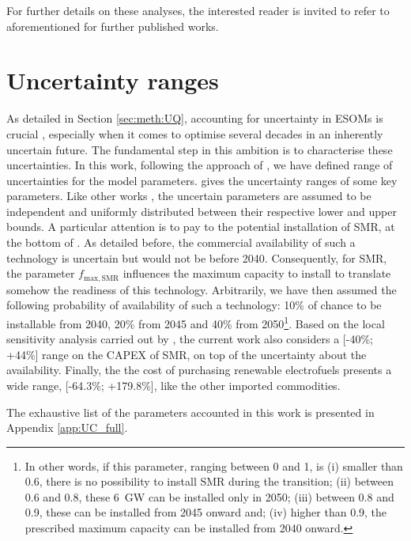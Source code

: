 For further details on these analyses, the interested reader is invited to refer to aforementioned for further published works.

\section{Uncertainty ranges}
\label{sec:cs:uncertainty}
As detailed in Section \ref{sec:meth:UQ}, accounting for uncertainty in \gls{ESOMs} is crucial \cite{mavromatidis2018uncertainty}, especially when it comes to optimise several decades in an inherently uncertain future. The fundamental step in this ambition is to characterise these uncertainties. In this work, following the approach of \citet{Moret2017PhDThesis}, we have defined range of uncertainties for the model parameters.  gives the uncertainty ranges of some key parameters. Like other works \cite{li2019renewables,coppitters2021robust}, the uncertain parameters are assumed to be independent and uniformly distributed between their respective lower and upper bounds. A particular attention is to pay to the potential installation of \gls{SMR}, at the bottom of . As detailed before, the commercial availability of such a technology is uncertain but would not be before 2040. Consequently, for \gls{SMR}, the parameter $f_{\mathrm{max,SMR}}$ influences the maximum capacity to install to translate somehow the readiness of this technology. Arbitrarily, we have then assumed the following probability of availability of such a technology: 10\% of chance to be installable from 2040, 20\% from 2045 and 40\% from 2050\footnote{In other words, if this parameter, ranging between 0 and 1, is (i) smaller than 0.6, there is no possibility to install \gls{SMR} during the transition; (ii) between 0.6 and 0.8, these 6~GW can be installed only in 2050; (iii) between 0.8 and 0.9, these can be installed from 2045 onward and; (iv) higher than 0.9, the prescribed maximum capacity can be installed from 2040 onward. }. Based on the local sensitivity analysis carried out by \citet{PATHS2050}, the current work also considers a [-40\%; +44\%] range on the CAPEX of SMR, on top of the uncertainty about the availability. Finally, the the cost of purchasing renewable electrofuels presents a wide range, [-64.3\%; +179.8\%], like the other imported commodities.

The exhaustive list of the parameters accounted in this work is presented in Appendix \ref{app:UC_full}.

